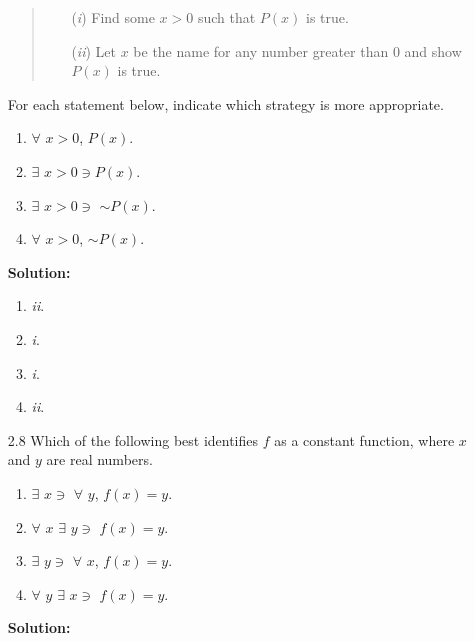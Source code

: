 \begin{enumerate}
      \begin{quote}
         \begin{enumerate}
            \item[(\textit{i})]  Find some $x > 0$ such that $P(x)$ is true.
            \item[(\textit{ii})] Let $x$ be the name for any number greater 
                                 than 0 and show $P(x)$ is true.
         \end{enumerate}
      \end{quote}

      For each statement below, indicate which strategy is more appropriate.

      \begin{enumerate}
         \item $\forall$ $x > 0$, $P(x)$.
         \item $\exists$ $x > 0 \ni P(x)$.
         \item $\exists$ $x > 0 \ni$ $\sim$$P(x)$.
         \item $\forall$ $x > 0$, $\sim$$P(x)$.
      \end{enumerate}

      \textbf{Solution:}

      \begin{enumerate}
         \item \textit{ii}.
         \item \textit{i}.
         \item \textit{i}.
         \item \textit{ii}.
      \end{enumerate}
   \item[2.8] Which of the following best identifies $f$ as a constant 
              function, where $x$ and $y$ are real numbers.
      \begin{enumerate}
         \item $\exists$ $x \ni$ $\forall$ $y$, $f(x) = y$.
         \item $\forall$ $x$ $\exists$ $y \ni$ $f(x) = y$.
         \item $\exists$ $y \ni$ $\forall$ $x$, $f(x) = y$.
         \item $\forall$ $y$ $\exists$ $x \ni$ $f(x) = y$.
      \end{enumerate}

      \textbf{Solution:}


\end{enumerate}

